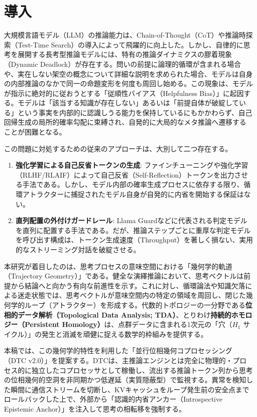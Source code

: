 \documentclass[11pt,a4paper]{article}
\begin{document}
\section{導入}

大規模言語モデル（LLM）の推論能力は、Chain-of-Thought（CoT）や推論時探索（Test-Time Search）の導入によって飛躍的に向上した。しかし、自律的に思考を展開する長考型推論モデルには、特有の推論ダイナミクスの膠着現象（Dynamic Deadlock）が存在する。問いの前提に論理的循環が含まれる場合や、実在しない架空の概念について詳細な説明を求められた場合、モデルは自身の内部推論のなかで同一の命題変形を何度も周回し始める。この現象は、モデルが指示に絶対的に従おうとする「従順性バイアス（Helpfulness Bias）」に起因する。モデルは「該当する知識が存在しない」あるいは「前提自体が破綻している」という事実を内部的に認識しうる能力を保持しているにもかかわらず、自己回帰生成の局所的確率勾配に束縛され、自発的に大局的なメタ推論へ遷移することが困難となる。

この問題に対処するための従来のアプローチは、大別して二つ存在する。
\begin{enumerate}
    \item \textbf{強化学習による自己反省トークンの生成}: ファインチューニングや強化学習（RLHF/RLAIF）によって自己反省（Self-Reflection）トークンを出力させる手法である。しかし、モデル内部の確率生成プロセスに依存する限り、循環アトラクターに捕捉されたモデル自身が自発的に内省を開始する保証はない。
    \item \textbf{直列配置の外付けガードレール}: Llama Guardなどに代表される判定モデルを直列に配置する手法である。だが、推論ステップごとに重厚な判定モデルを呼び出す構成は、トークン生成速度（Throughput）を著しく損ない、実用的なストリーミング対話を破綻させる。
\end{enumerate}

本研究が着目したのは、思考プロセスの意味空間における「幾何学的軌道（Trajectory Geometry）」である。健全な演繹推論において、思考ベクトルは前提から結論へと向かう有向な前進性を示す。これに対し、循環論法や知識欠落による迷走状態では、思考ベクトルが意味空間内の特定の領域を周回し、閉じた幾何学的ループ（アトラクター）を形成する。代数的トポロジーの一分野である\textbf{位相的データ解析（Topological Data Analysis; TDA）}、とりわけ\textbf{持続的ホモロジー（Persistent Homology）}は、点群データに含まれる1次元の「穴（$H_1$ サイクル）」の発生と消滅を頑健に捉える数学的枠組みを提供する。

本稿では、この幾何学的特性を利用した「並行位相幾何コプロセッシング（DTC v2.0）」を提案する。DTCは、主推論エンジンとは完全に物理的・プロセス的に独立したコプロセッサとして稼働し、流出する推論トークン列から思考の位相幾何的空洞を非同期かつ低遅延（実質隠蔽型）で監視する。異常を検知した瞬間に通信ストリームを切断し、KVキャッシュをループ発生前の安全点までロールバックした上で、外部から「認識的内省アンカー（Introspective Epistemic Anchor）」を注入して思考の相転移を強制する。
\end{document}
